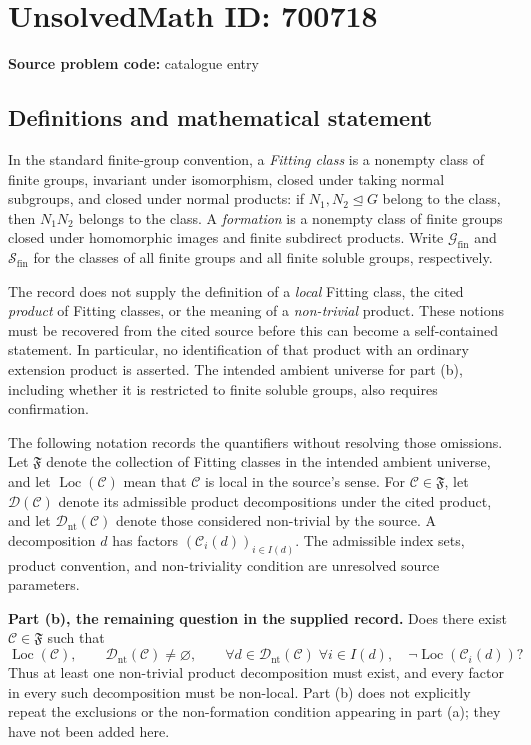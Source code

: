 \documentclass[11pt]{article}
\begin{document}
\section*{UnsolvedMath ID: 700718}
\textbf{Source problem code:} catalogue entry
\subsection{Definitions and mathematical statement}
In the standard finite-group convention, a \emph{Fitting class} is a nonempty class of finite groups, invariant under isomorphism, closed under taking normal subgroups, and closed under normal products: if \(N_1,N_2\trianglelefteq G\) belong to the class, then \(N_1N_2\) belongs to the class. A \emph{formation} is a nonempty class of finite groups closed under homomorphic images and finite subdirect products. Write \(\mathcal G_{\mathrm{fin}}\) and \(\mathcal S_{\mathrm{fin}}\) for the classes of all finite groups and all finite soluble groups, respectively.

The record does not supply the definition of a \emph{local} Fitting class, the cited \emph{product} of Fitting classes, or the meaning of a \emph{non-trivial} product. These notions must be recovered from the cited source before this can become a self-contained statement. In particular, no identification of that product with an ordinary extension product is asserted. The intended ambient universe for part (b), including whether it is restricted to finite soluble groups, also requires confirmation.

The following notation records the quantifiers without resolving those omissions. Let \(\mathfrak F\) denote the collection of Fitting classes in the intended ambient universe, and let \(\operatorname{Loc}(\mathcal C)\) mean that \(\mathcal C\) is local in the source's sense. For \(\mathcal C\in\mathfrak F\), let \(\mathscr D(\mathcal C)\) denote its admissible product decompositions under the cited product, and let \(\mathscr D_{\mathrm{nt}}(\mathcal C)\) denote those considered non-trivial by the source. A decomposition \(d\) has factors \((\mathcal C_i(d))_{i\in I(d)}\). The admissible index sets, product convention, and non-triviality condition are unresolved source parameters.

\textbf{Part (b), the remaining question in the supplied record.} Does there exist \(\mathcal C\in\mathfrak F\) such that
\[
\operatorname{Loc}(\mathcal C),\qquad
\mathscr D_{\mathrm{nt}}(\mathcal C)\ne\varnothing,
\qquad
\forall d\in\mathscr D_{\mathrm{nt}}(\mathcal C)\;
\forall i\in I(d),\quad
\neg\operatorname{Loc}(\mathcal C_i(d))?
\]
Thus at least one non-trivial product decomposition must exist, and every factor in every such decomposition must be non-local. Part (b) does not explicitly repeat the exclusions or the non-formation condition appearing in part (a); they have not been added here.
\end{document}
